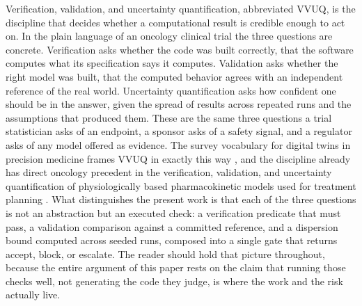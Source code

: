 
Verification, validation, and uncertainty quantification, abbreviated VVUQ, is
the discipline that decides whether a computational result is credible enough to
act on. In the plain language of an oncology clinical trial the three questions
are concrete. Verification asks whether the code was built correctly, that the
software computes what its specification says it computes. Validation asks
whether the right model was built, that the computed behavior agrees with an
independent reference of the real world. Uncertainty quantification asks how
confident one should be in the answer, given the spread of results across
repeated runs and the assumptions that produced them. These are the same three
questions a trial statistician asks of an endpoint, a sponsor asks of a safety
signal, and a regulator asks of any model offered as evidence. The survey
vocabulary for digital twins in precision medicine frames VVUQ in exactly this
way \cite{sel2025vvuq}, and the discipline already has direct oncology precedent
in the verification, validation, and uncertainty quantification of
physiologically based pharmacokinetic models used for treatment planning
\cite{zaid2025pbpk}. What distinguishes the present work is that each of the
three questions is not an abstraction but an executed check: a verification
predicate that must pass, a validation comparison against a committed reference,
and a dispersion bound computed across seeded runs, composed into a single gate
that returns accept, block, or escalate. The reader should hold that picture
throughout, because the entire argument of this paper rests on the claim that
running those checks well, not generating the code they judge, is where the work
and the risk actually live.

